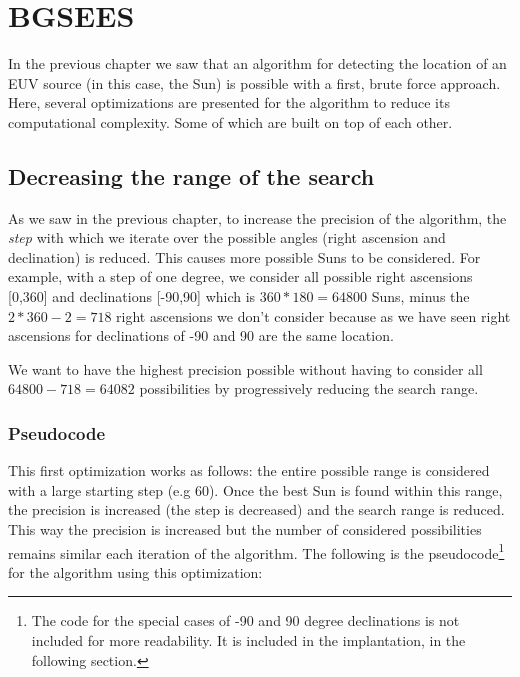 \chapter{BGSEES}

In the previous chapter we saw that an algorithm for detecting the location of an EUV source (in this case, the Sun) is possible with a first, brute force approach. Here, several optimizations are presented for the algorithm to reduce its computational complexity. Some of which are built on top of each other.

\section{Decreasing the range of the search}

As we saw in the previous chapter, to increase the precision of the algorithm, the \textit{step} with which we iterate over the possible angles (right ascension and declination) is reduced. This causes more possible Suns to be considered. For example, with a step of one degree, we consider all possible right ascensions [0,360] and declinations [-90,90] which is  $360*180 = 64800$ Suns, minus the $2*360 - 2 = 718$ right ascensions we don't consider because as we have seen right ascensions for declinations of -90 and 90 are the same location.

We want to have the highest precision possible without having to consider all $64800 - 718 = 64082$ possibilities by progressively reducing the search range. 

\subsection{Pseudocode}

This first optimization works as follows: the entire possible range is considered with a large starting step (e.g 60). Once the best Sun is found within this range, the precision is increased (the step is decreased) and the search range is reduced. This way the precision is increased but the number of considered possibilities remains similar each iteration of the algorithm. The following is the pseudocode\footnote{The code for the special cases of -90 and 90 degree declinations is not included for more readability. It is included in the implantation, in the following section.} for the algorithm using this optimization:


